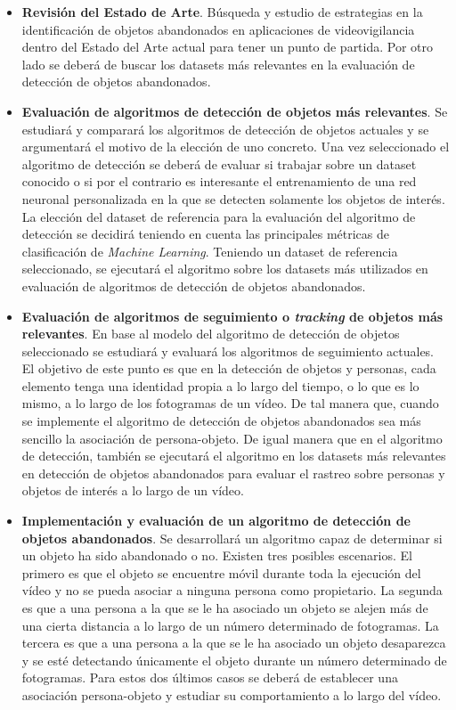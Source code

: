 \begin{itemize}
    \item \textbf{Revisión del Estado de Arte}. Búsqueda y estudio de estrategias en la identificación de objetos abandonados en aplicaciones de videovigilancia dentro del Estado del Arte actual para tener un punto de partida. Por otro lado se deberá de buscar los datasets más relevantes en la evaluación de detección de objetos abandonados.
    \item \textbf{Evaluación de algoritmos de detección de objetos más relevantes}. Se estudiará y comparará los algoritmos de detección de objetos actuales y se argumentará el motivo de la elección de uno concreto. Una vez seleccionado el algoritmo de detección se deberá de evaluar si trabajar sobre un dataset conocido o si por el contrario es interesante el entrenamiento de una red neuronal personalizada en la que se detecten solamente los objetos de interés. La elección del dataset de referencia para la evaluación del algoritmo de detección se decidirá teniendo en cuenta las principales métricas de clasificación de \textit{Machine Learning}. Teniendo un dataset de referencia seleccionado, se ejecutará el algoritmo sobre los datasets más utilizados en evaluación de algoritmos de detección de objetos abandonados.
    \item \textbf{Evaluación de algoritmos de seguimiento o \textit{tracking} de objetos más relevantes}. En base al modelo del algoritmo de detección de objetos seleccionado se estudiará y evaluará los algoritmos de seguimiento actuales. El objetivo de este punto es que en la detección de objetos y personas, cada elemento tenga una identidad propia a lo largo del tiempo, o lo que es lo mismo, a lo largo de los fotogramas de un vídeo. De tal manera que, cuando se implemente el algoritmo de detección de objetos abandonados sea más sencillo la asociación de persona-objeto. De igual manera que en el algoritmo de detección, también se ejecutará el algoritmo en los datasets más relevantes en detección de objetos abandonados para evaluar el rastreo sobre personas y objetos de interés a lo largo de un vídeo.
    \item \textbf{Implementación y evaluación de un algoritmo de detección de objetos abandonados}. Se desarrollará un algoritmo capaz de determinar si un objeto ha sido abandonado o no. Existen tres posibles escenarios. El primero es que el objeto se encuentre móvil durante toda la ejecución del vídeo y no se pueda asociar a ninguna persona como propietario. La segunda es que a una persona a la que se le ha asociado un objeto se alejen más de una cierta distancia a lo largo de un número determinado de fotogramas. La tercera es que a una persona a la que se le ha asociado un objeto desaparezca y se esté detectando únicamente el objeto durante un número determinado de fotogramas. Para estos dos últimos casos se deberá de establecer una asociación persona-objeto y estudiar su comportamiento a lo largo del vídeo.
\end{itemize}

